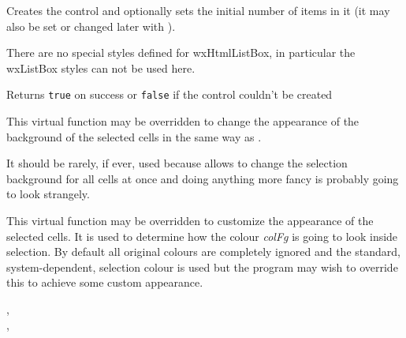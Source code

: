 
Creates the control and optionally sets the initial number of items in it
(it may also be set or changed later with 
).

There are no special styles defined for wxHtmlListBox, in particular the
wxListBox styles can not be used here.

Returns {\tt true} on success or {\tt false} if the control couldn't be created


\label{wxhtmllistboxgetselectedtextbgcolour}


This virtual function may be overridden to change the appearance of the
background of the selected cells in the same way as 
.

It should be rarely, if ever, used because 
 allows to
change the selection background for all cells at once and doing anything more
fancy is probably going to look strangely.




\label{wxhtmllistboxgetselectedtextcolour}


This virtual function may be overridden to customize the appearance of the
selected cells. It is used to determine how the colour {\it colFg} is going to
look inside selection. By default all original colours are completely ignored
and the standard, system-dependent, selection colour is used but the program
may wish to override this to achieve some custom appearance.


,\\
,\\



